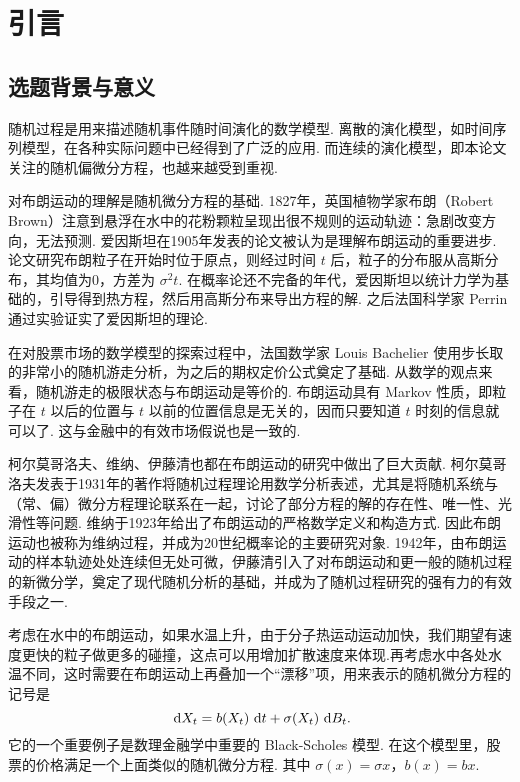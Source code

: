 
\chapter{引言}
\label{chap_int}
\section{选题背景与意义}
随机过程是用来描述随机事件随时间演化的数学模型. 离散的演化模型，如时间序列模型，在各种实际问题中已经得到了广泛的应用. 而连续的演化模型，即本论文关注的随机偏微分方程，也越来越受到重视. 


对布朗运动的理解是随机微分方程的基础. 1827年，英国植物学家布朗（Robert Brown）注意到悬浮在水中的花粉颗粒呈现出很不规则的运动轨迹：急剧改变方向，无法预测. 
爱因斯坦在1905年发表的论文\cite{Einstein}被认为是理解布朗运动的重要进步. 论文研究布朗粒子在开始时位于原点，则经过时间 $t$ 后，粒子的分布服从高斯分布，其均值为0，方差为 $\sigma^2t$. 在概率论还不完备的年代，爱因斯坦以统计力学为基础的，引导得到热方程，然后用高斯分布来导出方程的解. 之后法国科学家 Perrin 通过实验证实了爱因斯坦的理论.


在对股票市场的数学模型的探索过程中，法国数学家 Louis Bachelier 使用步长取的非常小的随机游走分析，为之后的期权定价公式奠定了基础\cite{book_finance,book_fenxi}. 从数学的观点来看，随机游走的极限状态与布朗运动是等价的. 布朗运动具有 Markov 性质，即粒子在 $t$ 以后的位置与 $t$ 以前的位置信息是无关的，因而只要知道 $t$ 时刻的信息就可以了. 这与金融中的有效市场假说也是一致的. 


柯尔莫哥洛夫、维纳、伊藤清也都在布朗运动的研究中做出了巨大贡献. 柯尔莫哥洛夫发表于1931年的著作\cite{Kolmogoroff}将随机过程理论用数学分析表述，尤其是将随机系统与（常、偏）微分方程理论联系在一起，讨论了部分方程的解的存在性、唯一性、光滑性等问题. 维纳于1923年给出了布朗运动的严格数学定义和构造方式. 因此布朗运动也被称为维纳过程，并成为20世纪概率论的主要研究对象. 1942年，由布朗运动的样本轨迹处处连续但无处可微，伊藤清引入了对布朗运动和更一般的随机过程的新微分学，奠定了现代随机分析的基础，并成为了随机过程研究的强有力的有效手段之一\cite{ref_psg}. 


考虑在水中的布朗运动，如果水温上升，由于分子热运动运动加快，我们期望有速度更快的粒子做更多的碰撞，这点可以用增加扩散速度来体现.再考虑水中各处水温不同，这时需要在布朗运动上再叠加一个“漂移”项，用来表示的随机微分方程的记号是
\begin{equation}
	\text{ d} X_t =  b(X_t) \text{ d} t +  \sigma(X_t) \text{ d} B_t .
\end{equation}
它的一个重要例子是数理金融学中重要的 Black-Scholes 模型\cite{book_finance}. 在这个模型里，股票的价格满足一个上面类似的随机微分方程. 其中 $\sigma(x) = \sigma x$，$b(x)=bx$. 



